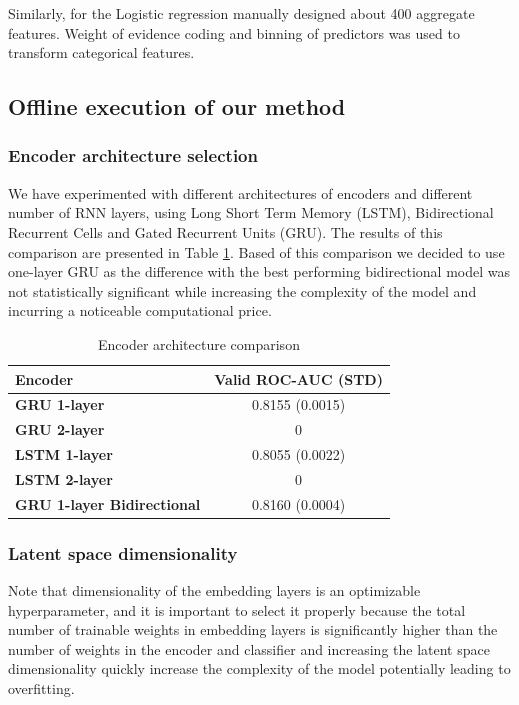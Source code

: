 \documentclass[sigconf]{acmart}
\begin{document}
Similarly, for the Logistic regression manually designed about 400 aggregate features. Weight of evidence coding and binning of predictors \cite{lund2016woe} was used to transform categorical features.

\subsection{Offline execution of our method} \label{sec-exec}

\subsubsection{Encoder architecture selection} \label{sec-arc-sel}

We have experimented with different architectures of encoders and different number of RNN layers, using Long Short Term Memory (LSTM), Bidirectional Recurrent Cells \cite{schuster1997bidirectional} and Gated Recurrent Units (GRU). The results of this comparison are presented in Table \ref{tab-enc-arch}. Based of this comparison we decided to use one-layer GRU as the difference with the best performing bidirectional model was not statistically significant while increasing the complexity of the model and incurring a noticeable computational price.

\begin{table}[ht]
\caption{Encoder architecture comparison}
\begin{tabular}{ | l | c |  }
\hline
\textbf{Encoder} & \textbf{Valid ROC-AUC (STD)} \\
\hline
\textbf{GRU 1-layer} & 0.8155 (0.0015)  \\
\textbf{GRU 2-layer} & 0  \\
\textbf{LSTM 1-layer} & 0.8055 (0.0022) \\
\textbf{LSTM 2-layer} & 0  \\
\textbf{GRU 1-layer Bidirectional} & 0.8160 (0.0004)  \\
\hline
\end{tabular}
\label{tab-enc-arch}
\end{table}


\subsubsection{Latent space dimensionality}

Note that dimensionality of the embedding layers is an optimizable hyperparameter, and it is important to select it properly because  the total number of trainable weights in embedding layers is significantly higher than the number of weights in the encoder and classifier and increasing the latent space dimensionality quickly increase the complexity of the model potentially leading to overfitting.
\end{document}
